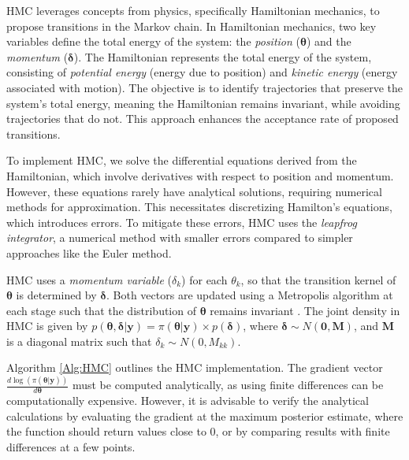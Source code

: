 HMC leverages concepts from physics, specifically Hamiltonian mechanics, to propose transitions in the Markov chain. In Hamiltonian mechanics, two key variables define the total energy of the system: the \textit{position} (\(\bm{\theta}\)) and the \textit{momentum} (\(\bm{\delta}\)). The Hamiltonian represents the total energy of the system, consisting of \textit{potential energy} (energy due to position) and \textit{kinetic energy} (energy associated with motion). The objective is to identify trajectories that preserve the system's total energy, meaning the Hamiltonian remains invariant, while avoiding trajectories that do not. This approach enhances the acceptance rate of proposed transitions.

To implement HMC, we solve the differential equations derived from the Hamiltonian, which involve derivatives with respect to position and momentum. However, these equations rarely have analytical solutions, requiring numerical methods for approximation. This necessitates discretizing Hamilton’s equations, which introduces errors. To mitigate these errors, HMC uses the \textit{leapfrog integrator}, a numerical method with smaller errors compared to simpler approaches like the Euler method.

HMC uses a \textit{momentum variable} (\(\delta_k\)) for each \(\theta_k\), so that the transition kernel of \(\bm{\theta}\) is determined by \(\bm{\delta}\). Both vectors are updated using a Metropolis algorithm at each stage such that the distribution of \(\bm{\theta}\) remains invariant \cite{neal2011mcmc}. The joint density in HMC is given by \( p(\bm{\theta}, \bm{\delta} | \bm{y}) = \pi(\bm{\theta} | \bm{y}) \times p(\bm{\delta}) \), where \(\bm{\delta} \sim N(\bm{0}, \bm{M})\), and \(\bm{M}\) is a diagonal matrix such that \(\delta_k \sim N(0, M_{kk})\). 

Algorithm \ref{Alg:HMC} outlines the HMC implementation. The gradient vector \(\frac{d\log(\pi(\bm{\theta}|\bm{y}))}{d\bm{\theta}}\) must be computed analytically, as using finite differences can be computationally expensive. However, it is advisable to verify the analytical calculations by evaluating the gradient at the maximum posterior estimate, where the function should return values close to 0, or by comparing results with finite differences at a few points. 

